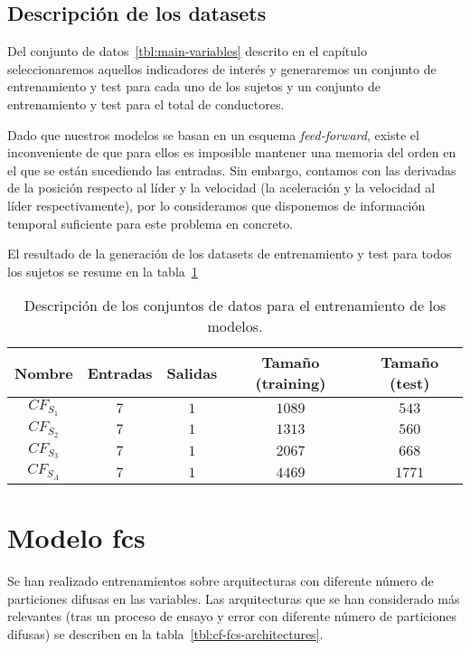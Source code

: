 \subsection{Descripción de los datasets}

Del conjunto de datos~\ref{tbl:main-variables} descrito en el capítulo~ seleccionaremos aquellos indicadores de interés y generaremos un conjunto de entrenamiento y test para cada uno de los sujetos y un conjunto de entrenamiento y test para el total de conductores.

Dado que nuestros modelos se basan en un esquema \textit{feed-forward}, existe el inconveniente de que para ellos es imposible mantener una memoria del orden en el que se están sucediendo las entradas. Sin embargo, contamos con las derivadas de la posición respecto al líder y la velocidad (la aceleración y la velocidad al líder respectivamente), por lo consideramos que disponemos de información temporal suficiente para este problema en concreto.

El resultado de la generación de los datasets de entrenamiento y test para todos los sujetos se resume en la tabla~\ref{tbl:cf-datasets-description}

\begin{table}
	\caption[Descripción de los conjuntos de datos]{Descripción de los conjuntos de datos para el entrenamiento de los modelos.}
	\label{tbl:cf-datasets-description}
	\begin{tabular}{ccccc}
		\toprule
		Nombre & Entradas & Salidas & Tamaño (training) & Tamaño (test) \\
		\midrule
		$CF_{S_1}$ & $7$ & $1$ & $1089$ & $543$ \\
		$CF_{S_2}$ & $7$ & $1$ & $1313$ & $560$ \\
		$CF_{S_3}$ & $7$ & $1$ & $2067$ & $668$ \\
		$CF_{S_A}$ & $7$ & $1$ & $4469$ & $1771$ \\
		\bottomrule
	\end{tabular}
\end{table}

\section{Modelo \ac{fcs}}

Se han realizado entrenamientos sobre arquitecturas con diferente número de particiones difusas en las variables. Las arquitecturas que se han considerado más relevantes (tras un proceso de ensayo y error con diferente número de particiones difusas) se describen en la tabla~\ref{tbl:cf-fcs-architectures}. 

